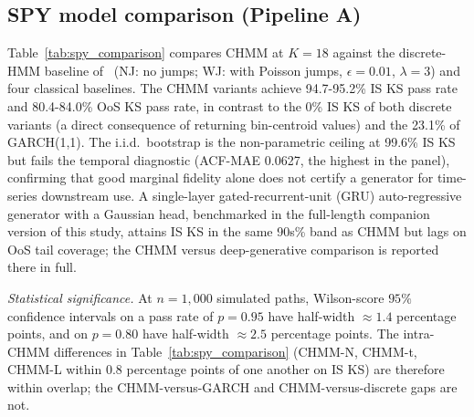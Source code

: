 \documentclass[sigconf,anonymous,nonacm=true]{acmart}
\begin{document}
\subsection{SPY model comparison (Pipeline A)}

Table~\ref{tab:spy_comparison} compares CHMM at $K = 18$ against the
discrete-HMM baseline of~\cite{alswaidan2026hybrid} (NJ: no jumps; WJ:
with Poisson jumps, $\epsilon = 0.01$, $\lambda = 3$) and four classical
baselines. The CHMM variants achieve 94.7-95.2\% IS KS pass rate and
80.4-84.0\% OoS KS pass rate, in contrast to the 0\% IS KS of both
discrete variants (a direct consequence of returning bin-centroid
values) and the 23.1\% of GARCH(1,1). The i.i.d.\ bootstrap is the
non-parametric ceiling at 99.6\% IS KS but fails the temporal
diagnostic (ACF-MAE 0.0627, the highest in the panel), confirming
that good marginal fidelity alone does not certify a generator for
time-series downstream use. A single-layer gated-recurrent-unit (GRU)
auto-regressive generator with a Gaussian head, benchmarked in the
full-length companion version of this study, attains IS KS in the
same 90s\% band as CHMM but lags on OoS tail coverage; the CHMM
versus deep-generative comparison is reported there in full.

\emph{Statistical significance.} At $n = 1{,}000$ simulated paths,
Wilson-score $95\%$ confidence intervals on a pass rate of
$p = 0.95$ have half-width $\approx 1.4$ percentage points, and on
$p = 0.80$ have half-width $\approx 2.5$ percentage points. The
intra-CHMM differences in Table~\ref{tab:spy_comparison} (CHMM-N,
CHMM-t, CHMM-L within 0.8 percentage points of one another on IS KS)
are therefore within overlap; the CHMM-versus-GARCH and
CHMM-versus-discrete gaps are not.
\end{document}
